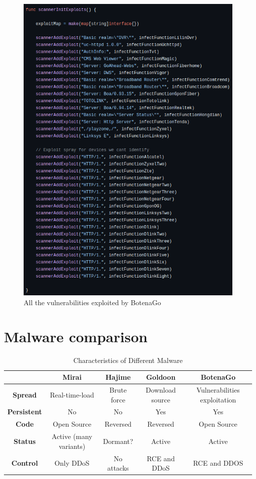 \begin{figure}[ht]
    \centering
    \includegraphics[scale=0.5]{resources/images/all-vulnerabilities-botenago.png}
    \caption{All the vulnerabilities exploited by BotenaGo}
    \label{fig:all-vulnerabilities-botenago}
\end{figure}

\section{Malware comparison}

\begin{table}
	\centering
	\begin{tabular}{|c|c|c|c|c|}
		\hline
		 & \textbf{Mirai} & \textbf{Hajime} & \textbf{Goldoon} & \textbf{BotenaGo} \\
		\hline
		\textbf{Spread} & Real-time-load & Brute force & Download source & Vulnerabilities exploitation \\
		\hline
		\textbf{Persistent} & No & No & Yes & Yes \\
		\hline
		\textbf{Code} & Open Source & Reversed & Reversed & Open Source \\
		\hline
		\textbf{Status} & Active (many variants) & Dormant? & Active & Active \\
		\hline
		\textbf{Control} & Only DDoS & No attacks & RCE and DDoS & RCE and DDOS \\
		\hline
	\end{tabular}
	\caption{Characteristics of Different Malware}
	\label{tab:malware_characteristics}
\end{table}

